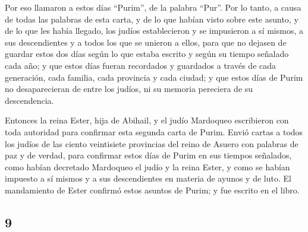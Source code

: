 \begin{paracol}{2}
 Por eso llamaron a estos días ``Purim'', de la palabra
``Pur''. Por lo tanto, a causa de todas las palabras de esta carta, y de
lo que habían visto sobre este asunto, y de lo que les había llegado,
 los judíos establecieron y se impusieron a sí mismos, a
sus descendientes y a todos los que se unieron a ellos, para que no
dejasen de guardar estos dos días según lo que estaba escrito y según su
tiempo señalado cada año;  y que estos días fueran
recordados y guardados a través de cada generación, cada familia, cada
provincia y cada ciudad; y que estos días de Purim no desaparecieran de
entre los judíos, ni su memoria pereciera de su descendencia.

 Entonces la reina Ester, hija de Abihail, y el judío
Mardoqueo escribieron con toda autoridad para confirmar esta segunda
carta de Purim.  Envió cartas a todos los judíos de las
ciento veintisiete provincias del reino de Asuero con palabras de paz y
de verdad,  para confirmar estos días de Purim en sus
tiempos señalados, como habían decretado Mardoqueo el judío y la reina
Ester, y como se habían impuesto a sí mismos y a sus descendientes en
materia de ayunos y de luto.  El mandamiento de Ester
confirmó estos asuntos de Purim; y fue escrito en el libro.

\switchcolumn
\begin{otherlanguage}{english}

\hypertarget{section-17}{%
\section{9}\label{section-17}}


\end{otherlanguage}
\end{paracol}

